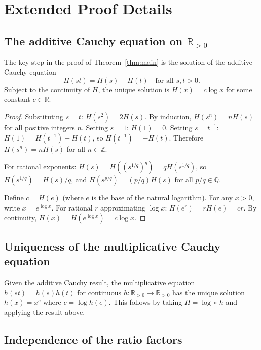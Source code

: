 \documentclass[12pt, a4paper]{article}
\theoremstyle{definition}
\theoremstyle{remark}
\newcommand{\R}{\mathbb{R}}
\newcommand{\Rp}{\mathbb{R}_{>0}}
\begin{document}
\appendix

\section{Extended Proof Details}\label{app:proof}

\subsection{The additive Cauchy equation on $\Rp$}

The key step in the proof of Theorem~\ref{thm:main} is the solution of the additive Cauchy equation
\begin{equation}\label{eq:addcauchy}
H(st) = H(s) + H(t) \quad \text{for all } s, t > 0.
\end{equation}
Subject to the continuity of $H$, the unique solution is $H(x) = c \log x$ for some constant $c \in \R$.

\begin{proof}
Substituting $s = t$: $H(s^2) = 2H(s)$. By induction, $H(s^n) = nH(s)$ for all positive integers $n$. Setting $s = 1$: $H(1) = 0$. Setting $s = t^{-1}$: $H(1) = H(t^{-1}) + H(t)$, so $H(t^{-1}) = -H(t)$. Therefore $H(s^n) = nH(s)$ for all $n \in \mathbb{Z}$.

For rational exponents: $H(s) = H((s^{1/q})^q) = qH(s^{1/q})$, so $H(s^{1/q}) = H(s)/q$, and $H(s^{p/q}) = (p/q)H(s)$ for all $p/q \in \mathbb{Q}$.

Define $c = H(e)$ (where $e$ is the base of the natural logarithm). For any $x > 0$, write $x = e^{\log x}$. For rational $r$ approximating $\log x$: $H(e^r) = rH(e) = cr$. By continuity, $H(x) = H(e^{\log x}) = c \log x$.
\end{proof}

\subsection{Uniqueness of the multiplicative Cauchy equation}

Given the additive Cauchy result, the multiplicative equation $h(st) = h(s)h(t)$ for continuous $h : \Rp \to \Rp$ has the unique solution $h(x) = x^c$ where $c = \log h(e)$. This follows by taking $H = \log \circ\, h$ and applying the result above.

\subsection{Independence of the ratio factors}
\end{document}
